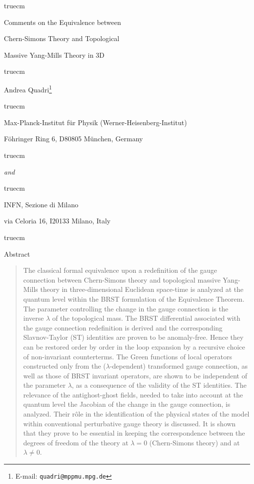 \documentclass[a4paper,11pt]{article}
\begin{document}

 truecm
\Large
\bf 

\centerline{Comments on the Equivalence between}
\centerline{Chern-Simons Theory and Topological}
\centerline{Massive Yang-Mills Theory in 3D}

\normalsize 
\rm

 truecm

\Large
\centerline{Andrea Quadri\footnote{E-mail: {\tt quadri@mppmu.mpg.de}}}

\normalsize
{} truecm

\centerline{Max-Planck-Institut f\"ur Physik (Werner-Heisenberg-Institut)}
\centerline{F\"ohringer Ring 6, D80805 M\"unchen, Germany}
 truecm

\centerline{{\em and}}

 truecm
\centerline{INFN, Sezione di Milano}
\centerline{via Celoria 16, I20133 Milano, Italy}


 truecm
\bf
\centerline{Abstract}

\rm 

\begin{quotation}
The classical formal 
equivalence upon a redefinition of the gauge connection
between Chern-Simons theory and topological massive Yang-Mills theory
in three-dimensional Euclidean space-time
is analyzed at the quantum level within the BRST formulation of the Equivalence
Theorem. The parameter controlling the change in the gauge connection 
is the inverse $\lambda$ of the topological mass.
The BRST differential associated with the gauge connection
redefinition is derived and the corresponding Slavnov-Taylor (ST) 
identities are proven to be anomaly-free.
Hence they can be restored order by order in the loop
expansion by a recursive choice of non-invariant counterterms.
%
The Green functions of local operators constructed only from the 
($\lambda$-dependent) transformed
gauge connection, as well as those of BRST invariant operators,
are shown to be independent of the parameter $\lambda$, 
as a consequence of the validity of the ST identities.
The relevance of the antighost-ghost
fields, needed to take into account at the quantum level
the Jacobian of the change in the gauge connection,
 is analyzed. Their r\^ole in the identification of
the physical states of the model within conventional perturbative
gauge theory is discussed.
It is shown that they prove to be essential in keeping
the correspondence between the degrees of freedom of the theory
at $\lambda = 0$ (Chern-Simons theory) and at $\lambda \neq 0$.
\end{quotation}
\end{document}
